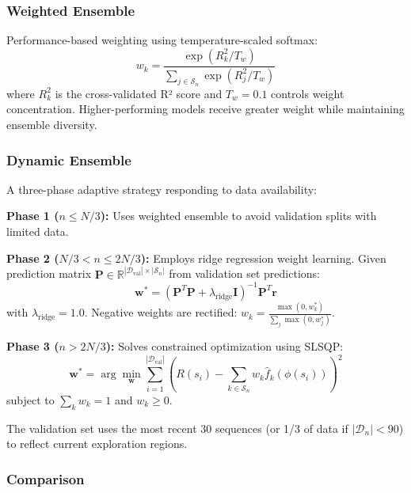 \documentclass[conference]{IEEEtran}
\begin{document}
\subsubsection{Weighted Ensemble}

Performance-based weighting using temperature-scaled softmax:
\begin{equation}
w_k = \frac{\exp(R^2_k / T_w)}{\sum_{j \in \mathcal{S}_n} \exp(R^2_j / T_w)}
\end{equation}
where $R^2_k$ is the cross-validated R² score and $T_w = 0.1$ controls weight concentration. Higher-performing models receive greater weight while maintaining ensemble diversity.

\subsubsection{Dynamic Ensemble}

A three-phase adaptive strategy responding to data availability:

\textbf{Phase 1 ($n \leq N/3$):} Uses weighted ensemble to avoid validation splits with limited data.

\textbf{Phase 2 ($N/3 < n \leq 2N/3$):} Employs ridge regression weight learning. Given prediction matrix $\mathbf{P} \in \mathbb{R}^{|\mathcal{D}_{\text{val}}| \times |\mathcal{S}_n|}$ from validation set predictions:
\begin{equation}
\mathbf{w}^* = (\mathbf{P}^T\mathbf{P} + \lambda_{\text{ridge}}\mathbf{I})^{-1}\mathbf{P}^T\mathbf{r}
\end{equation}
with $\lambda_{\text{ridge}} = 1.0$. Negative weights are rectified: $w_k = \frac{\max(0, w_k^*)}{\sum_j \max(0, w_j^*)}$.

\textbf{Phase 3 ($n > 2N/3$):} Solves constrained optimization using SLSQP:
\begin{equation}
\mathbf{w}^* = \arg\min_{\mathbf{w}} \sum_{i=1}^{|\mathcal{D}_{\text{val}}|} \left(R(s_i) - \sum_{k \in \mathcal{S}_n} w_k \hat{f}_k(\phi(s_i))\right)^2
\end{equation}
subject to $\sum_k w_k = 1$ and $w_k \geq 0$.

The validation set uses the most recent 30 sequences (or 1/3 of data if $|\mathcal{D}_n| < 90$) to reflect current exploration regions.

\subsubsection{Comparison}
\end{document}
